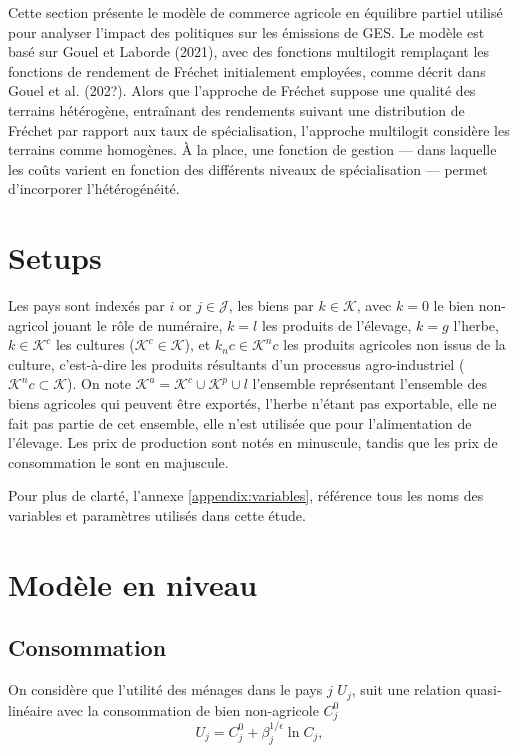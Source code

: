 Cette section présente le modèle de commerce agricole en équilibre partiel utilisé pour analyser l’impact des politiques sur les émissions de GES. Le modèle est basé sur Gouel et Laborde (2021), avec des fonctions multilogit remplaçant les fonctions de rendement de Fréchet initialement employées, comme décrit dans Gouel et al. (202?). Alors que l’approche de Fréchet suppose une qualité des terrains hétérogène, entraînant des rendements suivant une distribution de Fréchet par rapport aux taux de spécialisation, l’approche multilogit considère les terrains comme homogènes. À la place, une fonction de gestion — dans laquelle les coûts varient en fonction des différents niveaux de spécialisation — permet d’incorporer l’hétérogénéité.


\section{Setups}

Les pays sont indexés par $i$ or $j \in \mathcal{J}$, les biens par $k \in \mathcal{K}$, avec $k=0$ le bien non-agricol jouant le rôle de numéraire, $k = l$ les produits de l’élevage, $k = g$ l’herbe, $k \in \mathcal{K}^c$ les cultures ($\mathcal{K}^c \in \mathcal{K}$), et $k_nc \in \mathcal{K}^nc$ les produits agricoles non issus de la culture, c’est-à-dire les produits résultants d’un processus agro-industriel ($\mathcal{K}^nc \subset \mathcal{K}$). On note $\mathcal{K}^a = \mathcal{K}^c \cup \mathcal{K}^p \cup l$ l’ensemble représentant l’ensemble des biens agricoles qui peuvent être exportés, l’herbe n’étant pas exportable, elle ne fait pas partie de cet ensemble, elle n’est utilisée que pour l’alimentation de l’élevage. Les prix de production sont notés en minuscule, tandis que les prix de consommation le sont en majuscule.

Pour plus de clarté, l’annexe \ref{appendix:variables}, référence tous les noms des variables et paramètres utilisés dans cette étude.

\section{Modèle en niveau}
\subsection{Consommation}

On considère que l’utilité des ménages dans le pays $j$ $U_j$, suit une relation quasi-linéaire avec la consommation de bien non-agricole $C_j^0$
\begin{equation}\label{eq_u}
	U_j = C_j^0 + \beta_j^{1/\epsilon} \ln C_j,
\end{equation}

